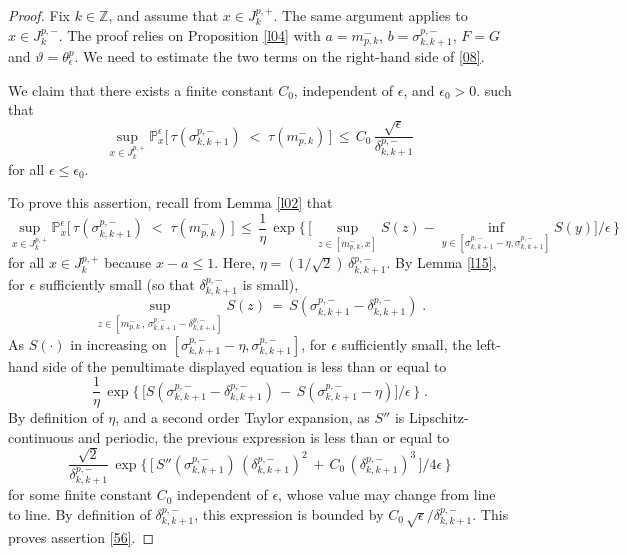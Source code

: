 \documentclass[reqno]{amsart}
\theoremstyle{plain}
\theoremstyle{definition}
\newcommand{\bb}[1]{{\mathbb #1}}
\newcounter{as}[section]
\newcommand{\<}{\langle}
\renewcommand{\>}{\rangle}
\begin{document}
\begin{proof}
Fix $k\in \bb Z$, and assume that $x\in J^{p,+}_k$. The same argument
applies to $x\in J^{p,-}_k$. The proof relies on Proposition \ref{l04}
with $a=m^-_{p,k}$, $b=\sigma^{p,-}_{k,k+1}$, $F=G$ and
$\vartheta = \theta^p_\epsilon$. We need to estimate the two terms on
the right-hand side of \eqref{08}.

We claim that there exists a finite constant $C_0$, independent of
$\epsilon$, and $\epsilon_0>0$. such that
\begin{equation}
\label{56}
\sup_{x\in J^{p,+}_{k}}
\bb P^\epsilon_{x} \big[\, \tau (\sigma^{p,-}_{k, k+1})\; < \;
\tau (m^{-}_{p,k})\,\big] \,\le \,
C_0 \, 
\frac{\sqrt{\epsilon}}{ \delta^{p,-}_{k,k+1}} 
\end{equation}
for all $\epsilon \le \epsilon_0$. 

To prove this assertion, recall from Lemma \ref{l02} that
\begin{equation*}
\sup_{x\in J^{p,+}_{k}}
\bb P^\epsilon_{x}\big[\,\tau (\sigma^{p,-}_{k,k+1})\; < \;
\tau (m^{-}_{p,k})\,\big] \,\leq\,
\frac{1}{\eta}   \,
\exp\Big\{ \,\big[ \,
\sup_{z\in [m^-_{p,k},x] } S(z) -
\inf_{y\in [\sigma^{p,-}_{k,k+1}-\eta, \sigma^{p,-}_{k,k+1}]} S(y)
\big]/\epsilon \,\Big\}
\end{equation*}
for all $x\in J^{p,+}_k$ because $x-a\le 1$. Here,
$\eta= (1/\sqrt{2}) \, \delta^{p,-}_{k,k+1}$.  By Lemma
\ref{l15}, for $\epsilon$ sufficiently small (so that
$\delta^{p,-}_{k,k+1}$ is small),
\begin{equation*}
\sup_{z\in [m^-_{p,k} \,,\, \sigma^{p,-}_{k,k+1} -
\delta^{p,-}_{k,k+1}]} S(z) \, = \,
S(\sigma^{p,-}_{k,k+1} - \delta^{p,-}_{k,k+1})\;.
\end{equation*}
As $S(\cdot)$ in increasing on
$[\sigma^{p,-}_{k,k+1}-\eta, \sigma^{p,-}_{k,k+1}]$, for $\epsilon$
sufficiently small, the left-hand side of the penultimate displayed
equation is less than or equal to
\begin{equation*}
\frac{1}{\eta}   \,
\exp\Big\{\,\Big[  S(\sigma^{p,-}_{k,k+1} - \delta^{p,-}_{k,k+1}) \,-\,
S(\sigma^{p,-}_{k,k+1} - \eta ) \Big]/\epsilon\, \Big\}\;.
\end{equation*}
By definition of $\eta$, and a second order Taylor expansion, as $S''$
is Lipschitz-continuous and periodic, the previous expression is less
than or equal to
\begin{equation*}
\frac{\sqrt{2}}{\delta^{p,-}_{k,k+1}}  \,
\exp\Big\{\, \Big[\,
S''(\sigma^{p,-}_{k,k+1}) \,
(\delta^{p,-}_{k,k+1})^2 \,+\, C_0 \,
(\delta^{p,-}_{k,k+1})^3 \,\Big] /4\epsilon\, \Big\}
\end{equation*}
for some finite constant $C_0$ independent of $\epsilon$, whose value
may change from line to line. By definition of $\delta^{p,-}_{k,k+1}$,
this expression is bounded by
$C_0 \, \sqrt{\epsilon} / \delta^{p,-}_{k,k+1}$.  This proves
assertion \eqref{56}.


\end{proof}
\end{document}
